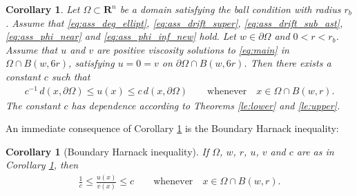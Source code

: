 \documentclass[12pt]{article}
\newtheorem{corollary}[theorem]{Corollary}
\numberwithin{komcounter}{section}
\begin{document}
\begin{corollary}\label{corr:dist}
Let $\Omega \subset \mathbf{R}^n$ be a domain satisfying the ball condition with radius $r_b$.
Assume that \eqref{eq:ass_deg_ellipt}, \eqref{eq:ass_drift_super}, \eqref{eq:ass_drift_sub_ast}, \eqref{eq:ass_phi_near} and \eqref{eq:ass_phi_inf_new}  hold.
Let $w \in \partial \Omega$ and $0 < r < r_b$.
Assume that $u$ and $v$ are positive viscosity solutions to \eqref{eq:main} in $\Omega \cap B(w, 6r)$,
satisfying $u = 0 = v$ on $\partial \Omega \cap B(w,6r)$.
Then there exists a constant $c$ such that
%
%
\begin{align*}
c^{-1}\, d(x, \partial \Omega) \leq u(x) \leq c \,d(x, \partial \Omega) \qquad \text{whenever} \quad x \in \Omega \cap B(w, r).
\end{align*}
%
The constant $c$ has dependence according to Theorems \ref{le:lower} and \ref{le:upper}.
\end{corollary}

An immediate consequence of Corollary \ref{corr:dist} is the Boundary Harnack inequality:

\begin{corollary}[Boundary Harnack inequality]\label{thm:harnack}
If $\Omega$, $w$, $r$, $u$, $v$ and $c$ are as in Corollary \ref{corr:dist},
then
%
\begin{align*}
\frac{1}{c} \leq \frac{u(x)}{v(x)} \leq c \qquad \text{whenever} \quad x \in \Omega \cap B(w, r).
\end{align*}
%
\end{corollary}
\end{document}
